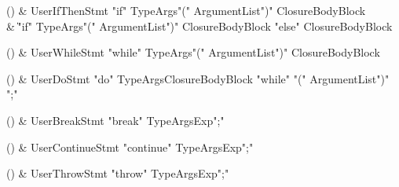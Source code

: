\begin{bbgrammarappendix}{4.4in}

() & UserIfThenStmt \label{prod:UserIfThenStmt}  \:
         \xcd"if" TypeArgs\opt \xcd"(" ArgumentList\opt \xcd")" ClosureBodyBlock \\
 &    \| \xcd"if" TypeArgs\opt \xcd"(" ArgumentList\opt \xcd")" ClosureBodyBlock \xcd"else" ClosureBodyBlock

\end{bbgrammarappendix}

\begin{bbgrammarappendix}{3.8in}

() & UserWhileStmt \label{prod:UserWhileStmt}  \:
         \xcd"while" TypeArgs\opt \xcd"(" ArgumentList\opt \xcd")" ClosureBodyBlock

\end{bbgrammarappendix}

\begin{bbgrammarappendix}{3.8in}

() & UserDoStmt \label{prod:UserDoStmt}  \:
 \xcd"do" TypeArgs\opt ClosureBodyBlock \xcd"while" \xcd"(" ArgumentList\opt \xcd")" \xcd";"

\end{bbgrammarappendix}

\begin{bbgrammarappendix}{3.8in}

() & UserBreakStmt \label{prod:UserBreakStmt}  \:
 \xcd"break" TypeArgs\opt Exp\opt \xcd";"

\end{bbgrammarappendix}

\begin{bbgrammarappendix}{3.8in}

() & UserContinueStmt \label{prod:UserContinueStmt}  \:
 \xcd"continue" TypeArgs\opt Exp\opt \xcd";"

\end{bbgrammarappendix}

\begin{bbgrammarappendix}{3.8in}

() & UserThrowStmt \label{prod:UserThrowStmt}  \:
 \xcd"throw" TypeArgs\opt Exp\opt \xcd";"

\end{bbgrammarappendix}

